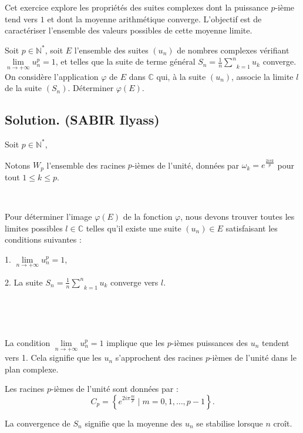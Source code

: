 Cet exercice explore les propri{\'e}t{\'e}s des suites complexes dont la puissance $p$-i{\`e}me tend vers $1$ et dont la moyenne arithm{\'e}tique converge. L'objectif est de caract{\'e}riser l'ensemble des valeurs possibles de cette moyenne limite.
\begin{exercise}[]
Soit $p \in \mathbb{N}^{\ast}$, soit $E$ l'ensemble des suites $(u_n)$ de
nombres complexes v{\'e}rifiant $\underset{n \to + \infty}{\lim} u_n^p = 1$,
et telles que la suite de terme g{\'e}n{\'e}ral $S_n = \frac{1}{n} 
\underset{k = 1}{\overset{n}{\sum}} u_k$ converge. On consid{\`e}re
l'application $\varphi$ de $E$ dans $\mathbb{C}$ qui, {\`a} la suite $(u_n)$,
associe la limite $l$ de la suite $(S_n)$. D{\'e}terminer $\varphi (E)$.
\end{exercise}

\subsection*{Solution. (SABIR Ilyass)}


Soit $p \in \mathbb{N}^{\ast}$,

Notons $W_p$ l'ensemble des racines $p$-i{\`e}mes de l'unit{\'e}, donn{\'e}es
par $\omega_k = e^{\frac{2 i \pi k}{p}}$ pour tout $1 \leq k \leq p$.

\

Pour d{\'e}terminer l'image $\varphi (E)$ de la fonction $\varphi$, nous
devons trouver toutes les limites possibles $l \in \mathbb{C}$ telles qu'il
existe une suite $(u_n) \in E$ satisfaisant les conditions suivantes :

1. $\underset{n \to + \infty}{\lim}  u_n^p = 1$,

2. La suite $S_n = \frac{1}{n}  \underset{k = 1}{\overset{n}{\sum}} u_k$
converge vers $l$.

\

\

La condition $\underset{n \to + \infty}{\lim}  u_n^p = 1$ implique que les
$p$-i{\`e}mes puissances des $u_n$ tendent vers 1. Cela signifie que les $u_n$
s'approchent des racines $p$-i{\`e}mes de l'unit{\'e} dans le plan complexe.

Les racines $p$-i{\`e}mes de l'unit{\'e} sont donn{\'e}es par :
\[ C_p = \left\{ e^{2 i \pi \frac{m}{p}} \mid m = 0, 1, \ldots, p - 1 \right\}
   . \]


La convergence de $S_n$ signifie que la moyenne des $u_n$ se stabilise lorsque
$n$ cro{\^i}t.

